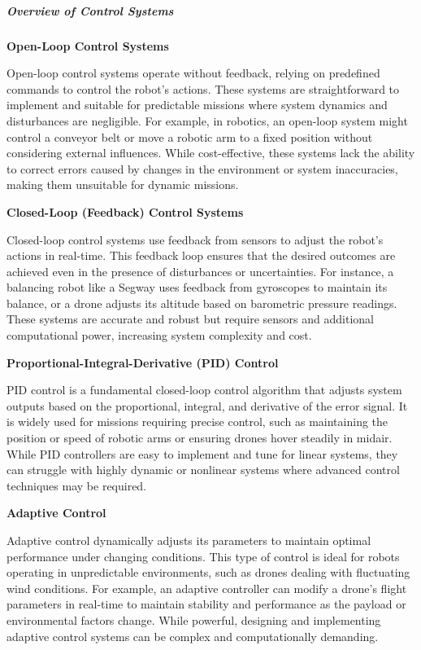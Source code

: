 \documentclass{book}
\providecommand{\ProjectDeepHeading}[2]{%
    \par\medskip\noindent\textbf{#2}\par\smallskip
}
\begin{document}
\subparagraph{Overview of Control Systems}

\ProjectDeepHeading{1}{Open-Loop Control Systems}
Open-loop control systems operate without feedback, relying on predefined commands to control the robot's actions. These systems are straightforward to implement and suitable for predictable missions where system dynamics and disturbances are negligible. For example, in robotics, an open-loop system might control a conveyor belt or move a robotic arm to a fixed position without considering external influences. While cost-effective, these systems lack the ability to correct errors caused by changes in the environment or system inaccuracies, making them unsuitable for dynamic missions.

\ProjectDeepHeading{1}{Closed-Loop (Feedback) Control Systems}
Closed-loop control systems use feedback from sensors to adjust the robot's actions in real-time. This feedback loop ensures that the desired outcomes are achieved even in the presence of disturbances or uncertainties. For instance, a balancing robot like a Segway uses feedback from gyroscopes to maintain its balance, or a drone adjusts its altitude based on barometric pressure readings. These systems are accurate and robust but require sensors and additional computational power, increasing system complexity and cost.

\ProjectDeepHeading{1}{Proportional-Integral-Derivative (PID) Control}
PID control is a fundamental closed-loop control algorithm that adjusts system outputs based on the proportional, integral, and derivative of the error signal. It is widely used for missions requiring precise control, such as maintaining the position or speed of robotic arms or ensuring drones hover steadily in midair. While PID controllers are easy to implement and tune for linear systems, they can struggle with highly dynamic or nonlinear systems where advanced control techniques may be required.

\ProjectDeepHeading{1}{Adaptive Control}
Adaptive control dynamically adjusts its parameters to maintain optimal performance under changing conditions. This type of control is ideal for robots operating in unpredictable environments, such as drones dealing with fluctuating wind conditions. For example, an adaptive controller can modify a drone's flight parameters in real-time to maintain stability and performance as the payload or environmental factors change. While powerful, designing and implementing adaptive control systems can be complex and computationally demanding.
\end{document}
